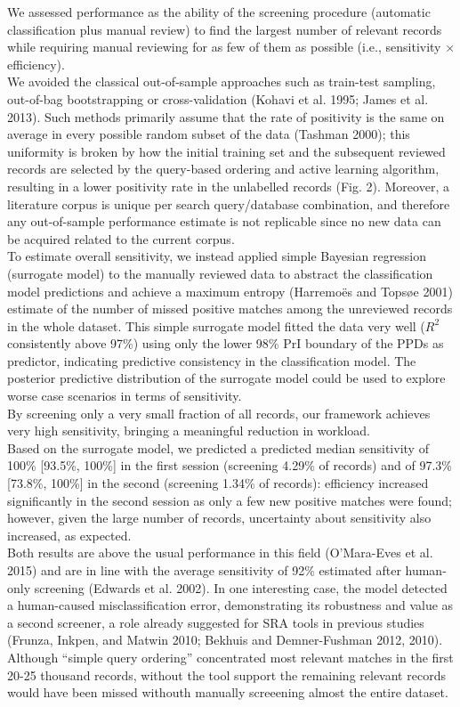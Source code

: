 \documentclass{article}
\begin{document}
We assessed performance as the ability of the screening procedure
(automatic classification plus manual review) to find the largest number
of relevant records while requiring manual reviewing for as few of them
as possible (i.e., sensitivity \(\times\) efficiency).\\
We avoided the classical out-of-sample approaches such as train-test
sampling, out-of-bag bootstrapping or cross-validation (Kohavi et al.
1995; James et al. 2013). Such methods primarily assume that the rate of
positivity is the same on average in every possible random subset of the
data (Tashman 2000); this uniformity is broken by how the initial
training set and the subsequent reviewed records are selected by the
query-based ordering and active learning algorithm, resulting in a lower
positivity rate in the unlabelled records (Fig. 2). Moreover, a
literature corpus is unique per search query/database combination, and
therefore any out-of-sample performance estimate is not replicable since
no new data can be acquired related to the current corpus.\\
To estimate overall sensitivity, we instead applied simple Bayesian
regression (surrogate model) to the manually reviewed data to abstract
the classification model predictions and achieve a maximum entropy
(Harremoës and Topsøe 2001) estimate of the number of missed positive
matches among the unreviewed records in the whole dataset. This simple
surrogate model fitted the data very well (\(R^2\) consistently above
97\%) using only the lower 98\% PrI boundary of the PPDs as predictor,
indicating predictive consistency in the classification model. The
posterior predictive distribution of the surrogate model could be used
to explore worse case scenarios in terms of sensitivity.\\

By screening only a very small fraction of all records, our framework
achieves very high sensitivity, bringing a meaningful reduction in
workload.\\
Based on the surrogate model, we predicted a predicted median
sensitivity of 100\% {[}93.5\%, 100\%{]} in the first session (screening
4.29\% of records) and of 97.3\% {[}73.8\%, 100\%{]} in the second
(screening 1.34\% of records): efficiency increased significantly in the
second session as only a few new positive matches were found; however,
given the large number of records, uncertainty about sensitivity also
increased, as expected.\\
Both results are above the usual performance in this field (O'Mara-Eves
et al. 2015) and are in line with the average sensitivity of 92\%
estimated after human-only screening (Edwards et al. 2002). In one
interesting case, the model detected a human-caused misclassification
error, demonstrating its robustness and value as a second screener, a
role already suggested for SRA tools in previous studies (Frunza,
Inkpen, and Matwin 2010; Bekhuis and Demner-Fushman 2012, 2010).
Although ``simple query ordering'' concentrated most relevant matches in
the first 20-25 thousand records, without the tool support the remaining
relevant records would have been missed withouth manually screeening
almost the entire dataset.\\
\end{document}
